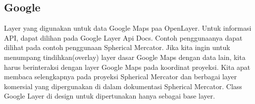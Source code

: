 \subsection {Google}
Layer yang digunakan untuk data Google Maps paa OpenLayer. Untuk informasi API, dapat dilihan pada Google Layer Api Docs. 
Contoh penggunaanya dapat dilihat pada contoh penggunaan Spherical Mercator.
Jika kita ingin untuk menumpang tindihkan(overlay) layer dasar Google Maps dengan data lain, kita harus berinteraksi dengan layer Google Maps pada koordinat proyeksi.
Kita apat membaca selengkapnya pada proyeksi Spherical Mercator dan berbagai layer komersial yang dipergunakan di dalam dokumentasi Spherical Mercator.
Class Google Layer di design untuk dipertunakan hanya sebagai base layer.

\subsection {}